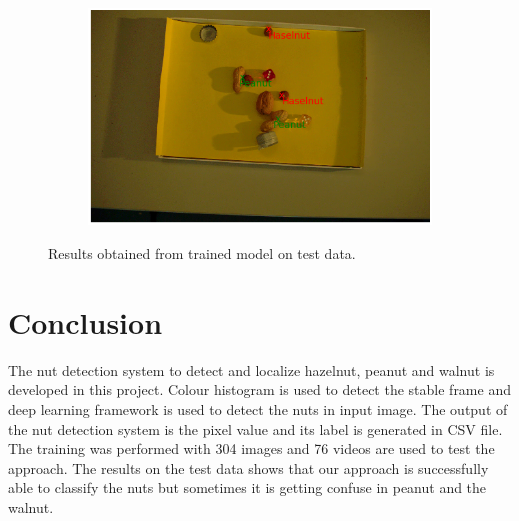\documentclass[journal,onecolumn,12pt]{IEEEtran}
\begin{document}
\begin{figure}
\begin{subfigure}[b]{0.4\textwidth}
	\end{subfigure}
	\begin{subfigure}[b]{0.4\textwidth}  
		\centering 
		\includegraphics[width=\textwidth]{images/od/missing_353.png}
	\end{subfigure}
	\caption{Results obtained from trained model on test data.}
	\label{fig:resultOD}
\end{figure}\goodbreak \newpage

%
%
%
%



\section{\newpage Conclusion}
The nut detection system to detect and localize hazelnut, peanut and walnut is developed in this project. Colour histogram is used to detect the stable frame and deep learning framework is used to detect the nuts in input image. The output of the nut detection system is the pixel value and its label is generated in CSV file. The training was performed with 304 images and 76 videos are used to test the approach. The results on the test data shows that our approach is successfully able to classify the nuts but sometimes it is getting confuse in peanut and the walnut. 
\end{document}
